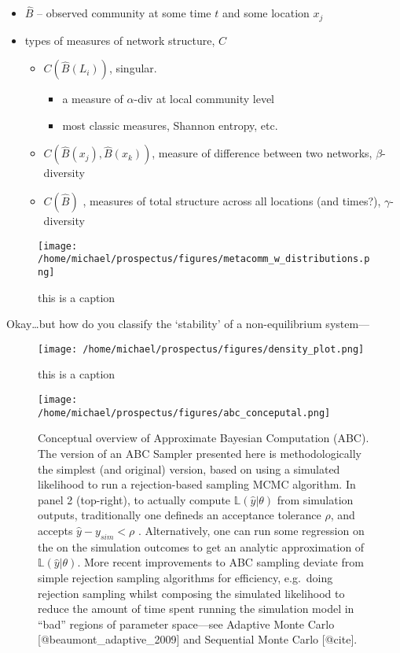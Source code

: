\begin{itemize}
\tightlist
\item
  \(\hat{B}\) -- observed community at some time \(t\) and some location
  \(x_j\)
\item
  types of measures of network structure, \(C\)

  \begin{itemize}
  \tightlist
  \item
    \(C({\hat{B}(L_i)})\), singular.

    \begin{itemize}
    \tightlist
    \item
      a measure of \(\alpha\)-div at local community level
    \item
      most classic measures, Shannon entropy, etc.
    \end{itemize}
  \item
    \(C(\hat{B}(x_j), \hat{B}(x_k))\), measure of difference between two
    networks, \(\beta\)-diversity
  \item
    \(C(\hat{B})\) , measures of total structure across all locations
    (and times?), \(\gamma\)-diversity
  \end{itemize}
\end{itemize}

\pagebreak

\begin{figure}
\centering
\texttt{[image: /home/michael/prospectus/figures/metacomm\_w\_distributions.png]}
\caption{this is a caption}
\end{figure}

Okay\ldots{}but how do you classify the `stability' of a non-equilibrium
system---

\begin{figure}
\centering
\texttt{[image: /home/michael/prospectus/figures/density\_plot.png]}
\caption{this is a caption}
\end{figure}

\begin{figure}
\centering
\texttt{[image: /home/michael/prospectus/figures/abc\_conceputal.png]}
\caption{Conceptual overview of Approximate Bayesian Computation (ABC).
The version of an ABC Sampler presented here is methodologically the
simplest (and original) version, based on using a simulated likelihood
to run a rejection-based sampling MCMC algorithm. In panel 2
(top-right), to actually compute \(\mathbb{L}(\hat{y} | \theta)\) from
simulation outputs, traditionally one defineds an acceptance tolerance
\(\rho\), and accepts \(\hat{y} - y_{sim} < \rho\) . Alternatively, one
can run some regression on the on the simulation outcomes to get an
analytic approximation of \(\mathbb{L}(\hat{y} | \theta)\). More recent
improvements to ABC sampling deviate from simple rejection sampling
algorithms for efficiency, e.g.~doing rejection sampling whilst
composing the simulated likelihood to reduce the amount of time spent
running the simulation model in ``bad'' regions of parameter space---see
Adaptive Monte Carlo {[}@beaumont\_adaptive\_2009{]} and Sequential
Monte Carlo {[}@cite{]}.}
\end{figure}

